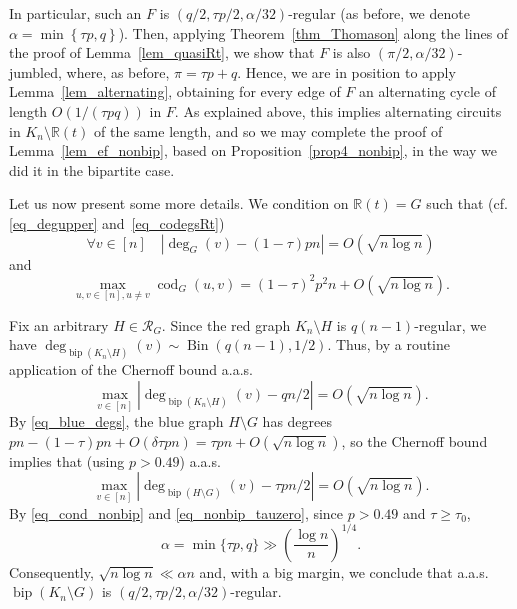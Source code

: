 \documentclass[12pt,reqno]{amsart}
\newcommand{\rc}{{\mathcal{R}}}
\newcommand{\R} {\mathbb R}
\newcommand{\Bi}{\operatorname{Bin}}
\newcommand{\cod}{\operatorname{cod}}
\newcommand{\bip}{\operatorname{bip}}
\theoremstyle{definition}
\begin{document}
In particular, such an $F$ is $(q/2,\tau p/2,\alpha/32)$-regular (as before, we denote $\alpha = \min \left\{ \tau p, q \right\}$). Then, applying Theorem~\ref{thm_Thomason} along the lines of the proof of Lemma~\ref{lem_quasiRt}, we show that $F$ is also $(\pi/2, \alpha/32)$-jumbled, where, as before, $\pi = \tau p + q$. Hence, we are in position to apply Lemma~\ref{lem_alternating}, obtaining for every edge of $F$ an alternating cycle of length $O\left( 1/(\tau p q) \right)$ in $F$. As explained above, this implies alternating circuits in $K_n \setminus \R(t)$ of the same length, and so we may complete the proof of Lemma~\ref{lem_ef_nonbip}, based on Proposition~\ref{prop4_nonbip}, in the way we did it in the bipartite case.

Let us now present some more details.
We condition on $\R(t) = G$ such that (cf. \eqref{eq_degupper} and~\eqref{eq_codegsRt})
\begin{equation}
\label{eq_blue_degs}
  \forall v \in [n] \quad |\deg_{G}(v) - (1 - \tau) pn| = O(\sqrt{n \log n})
\end{equation}
and
\begin{equation}
  \label{codegs}
  \max_{u, v \in [n], u \ne v} \cod_{G}(u,v) = (1 - \tau)^2p^2 n + O(\sqrt{n \log n}).
\end{equation}


	


Fix an arbitrary $H \in \rc_G$. Since the red graph $K_n \setminus H$ is $q(n-1)$-regular, we have $\deg_{\bip(K_n \setminus H)} (v) \sim \Bi(q(n-1), 1/2)$. Thus, by a routine application of the Chernoff bound  a.a.s.
\begin{equation}
\label{eq_red_deg}
\max_{v \in [n]} \left| \deg_{\bip(K_n \setminus H)}(v) - qn/2 \right| = O(\sqrt{n \log n}).
\end{equation}
By \eqref{eq_blue_degs}, the blue graph $H \setminus G$ has degrees $pn - (1 - \tau)pn + O\left( \delta \tau p n  \right) = \tau p n + O\left( \sqrt{n \log n} \right)$, so the Chernoff bound implies that (using $p > 0.49$) a.a.s.
\begin{equation}
\label{eq_blue_deg}
\max_{v \in [n]} \left|\deg_{\bip(H \setminus G)}(v) - \tau pn/2 \right| =O\left( \sqrt{n \log n} \right).
\end{equation}
 By \eqref{eq_cond_nonbip} and \eqref{eq_nonbip_tauzero}, since $p>0.49$ and $\tau\ge \tau_0$,
 \[
   \alpha=\min\{\tau p,q\} \gg \left(\frac{\log n}n\right)^{1/4}.
 \]
 Consequently, $\sqrt{n\log n} \ll \alpha n$ and, with a big margin, we conclude that a.a.s. $\bip(K_n \setminus G)$ is $(q/2, \tau p/2, \alpha/32)$-regular.
\end{document}
